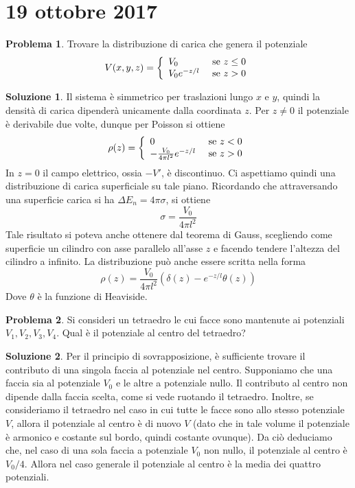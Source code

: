 \documentclass[a4paper,11pt]{book}
\theoremstyle{theorem}
\theoremstyle{definition}
\newtheorem{problema}{Problema}[section]
\newtheorem{soluzione}{Soluzione}[section]
\begin{document}
\section{19 ottobre 2017}
\begin{problema}
	Trovare la distribuzione di carica che genera il potenziale
	\[V(x,y,z)=\left\{\begin{array}{l l}
	V_0&\textrm{ se }z\leq0\\
	V_0e^{-z/l}&\textrm{ se }z>0
	\end{array}\right.\]
\end{problema}
\begin{soluzione}
	Il sistema è simmetrico per traslazioni lungo $x$ e $y$, quindi la densità di carica dipenderà unicamente dalla coordinata $z$. Per $z\neq0$ il potenziale è derivabile due volte, dunque per Poisson si ottiene
	\[\rho(z)=\left\{\begin{array}{l l}
	0&\textrm{ se }z<0\\
	-\frac{V_0}{4\pi l^2}e^{-z/l}&\textrm{ se }z>0
	\end{array}\right.\]
	In $z=0$ il campo elettrico, ossia $-V'$, è discontinuo. Ci aspettiamo quindi una distribuzione di carica superficiale su tale piano. Ricordando che attraversando una superficie carica si ha $\Delta E_n=4\pi\sigma$, si ottiene
	\[\sigma=\frac{V_0}{4\pi l^2}\]
	Tale risultato si poteva anche ottenere dal teorema di Gauss, scegliendo come superficie un cilindro con asse parallelo all'asse $z$ e facendo tendere l'altezza del cilindro a infinito. La distribuzione può anche essere scritta nella forma
	\[\rho(z)=\frac{V_0}{4\pi l^2}\left(\delta(z)-e^{-z/l}\theta(z)\right)\]
	Dove $\theta$ è la funzione di Heaviside.
\end{soluzione}
\begin{problema}
	Si consideri un tetraedro le cui facce sono mantenute ai potenziali $V_1,V_2,V_3,V_4$. Qual è il potenziale al centro del tetraedro?
\end{problema}
\begin{soluzione}
	Per il principio di sovrapposizione, è sufficiente trovare il contributo di una singola faccia al potenziale nel centro. Supponiamo che una faccia sia al potenziale $V_0$ e le altre a potenziale nullo. Il contributo al centro non dipende dalla faccia scelta, come si vede ruotando il tetraedro. Inoltre, se consideriamo il tetraedro nel caso in cui tutte le facce sono allo stesso potenziale $V$, allora il potenziale al centro è di nuovo $V$ (dato che in tale volume il potenziale è armonico e costante sul bordo, quindi costante ovunque). Da ciò deduciamo che, nel caso di una sola faccia a potenziale $V_0$ non nullo, il potenziale al centro è $V_0/4$. Allora nel caso generale il potenziale al centro è la media dei quattro potenziali.
\end{soluzione}
\newpage
\end{document}
